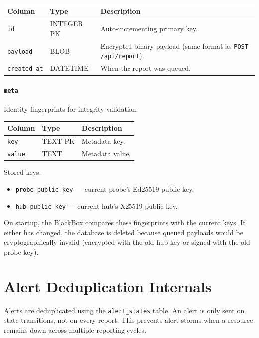 \documentclass[12pt]{report}
\begin{document}
\begin{longtable}{@{} l l p{6cm} @{}}
\toprule
\textbf{Column} & \textbf{Type} & \textbf{Description} \\
\midrule
\texttt{id} & INTEGER PK & Auto-incrementing primary key. \\
\texttt{payload} & BLOB & Encrypted binary payload (same format as
    \texttt{POST /api/report}). \\
\texttt{created\_at} & DATETIME & When the report was queued. \\
\bottomrule
\end{longtable}

\paragraph{\texttt{meta}} Identity fingerprints for integrity validation.

\begin{longtable}{@{} l l p{6cm} @{}}
\toprule
\textbf{Column} & \textbf{Type} & \textbf{Description} \\
\midrule
\texttt{key} & TEXT PK & Metadata key. \\
\texttt{value} & TEXT & Metadata value. \\
\bottomrule
\end{longtable}

Stored keys:
\begin{itemize}
    \item \texttt{probe\_public\_key} --- current probe's Ed25519 public key.
    \item \texttt{hub\_public\_key} --- current hub's X25519 public key.
\end{itemize}

On startup, the BlackBox compares these fingerprints with the current keys. If
either has changed, the database is deleted because queued payloads would be
cryptographically invalid (encrypted with the old hub key or signed with the
old probe key).

\section{Alert Deduplication Internals}

Alerts are deduplicated using the \texttt{alert\_states} table. An alert is
only sent on state transitions, not on every report. This prevents alert
storms when a resource remains down across multiple reporting cycles.
\end{document}
